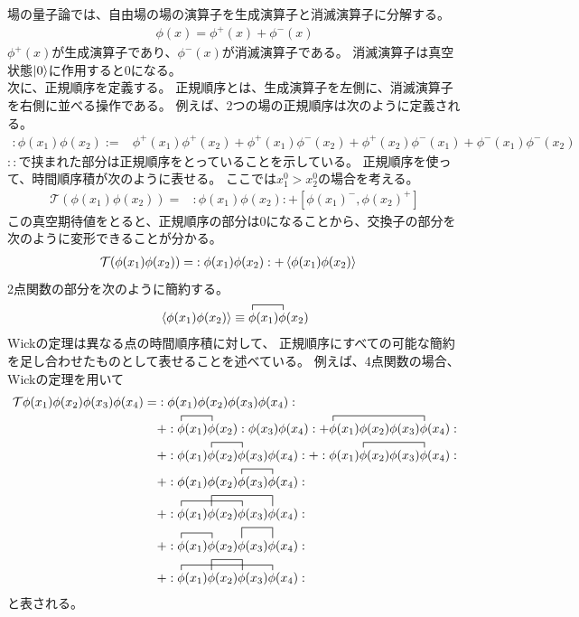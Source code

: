 \documentclass[11pt, dvipdfmx]{article}
\numberwithin{equation}{section}
\begin{document}
場の量子論では、自由場の場の演算子を生成演算子と消滅演算子に分解する。
\begin{align}
    \phi(x)=\phi^{+}(x)+\phi^{-}(x)
\end{align}
$\phi^{+}(x)$が生成演算子であり、$\phi^{-}(x)$が消滅演算子である。
消滅演算子は真空状態$\ket{0}$に作用すると0になる。
\\次に、正規順序を定義する。
正規順序とは、生成演算子を左側に、消滅演算子を右側に並べる操作である。
例えば、2つの場の正規順序は次のように定義される。
\begin{align}
    :\phi(x_1)\phi(x_2):=&\phi^{+}(x_1)\phi^{+}(x_2)+\phi^{+}(x_1)\phi^{-}(x_2)+\phi^{+}(x_2)\phi^{-}(x_1)+\phi^{-}(x_1)\phi^{-}(x_2)
\end{align}
$::$で挟まれた部分は正規順序をとっていることを示している。
正規順序を使って、時間順序積が次のように表せる。
ここでは$x^0_1>x^0_2$の場合を考える。
\begin{align}
    \mathcal{T}(\phi(x_1)\phi(x_2))=&:\phi(x_1)\phi(x_2):+[\phi(x_1)^- ,\phi(x_2)^+]
\end{align}
この真空期待値をとると、正規順序の部分は0になることから、交換子の部分を次のように変形できることが分かる。
\begin{align}
   \mathcal{T}(\phi(x_1)\phi(x_2))=&:\phi(x_1)\phi(x_2):+\ev{\phi(x_1)\phi(x_2)}
\end{align}
2点関数の部分を次のように簡約する。
\begin{align}
    \ev{\phi(x_1)\phi(x_2)}\equiv \contraction{}{\phi}{(x_1)}{\phi}\phi(x_1)\phi(x_2)
\end{align}
Wickの定理は異なる点の時間順序積に対して、
正規順序にすべての可能な簡約を足し合わせたものとして表せることを述べている。
例えば、4点関数の場合、Wickの定理を用いて
\begin{align}
    \mathcal{T}\phi(x_1)\phi(x_2)\phi(x_3)\phi(x_4)=&:\phi(x_1)\phi(x_2)\phi(x_3)\phi(x_4):\notag\\
    &+:\contraction{}{\phi}{(x_1)}{\phi}\phi(x_1)\phi(x_2):\phi(x_3)\phi(x_4):+\contraction{}{\phi}{(x_1)\phi(x_2)\phi(x_3)}{\phi}\phi(x_1)\phi(x_2)\phi(x_3)\phi(x_4):\notag\\
    &+:\contraction{\phi(x_1)}{\phi}{(x_2)}{\phi}\phi(x_1)\phi(x_2)\phi(x_3)\phi(x_4):+:\contraction{\phi(x_1)}{\phi}{(x_2)\phi(x_3)}{\phi}\phi(x_1)\phi(x_2)\phi(x_3)\phi(x_4):\notag\\
    &+:\contraction{\phi(x_1)\phi(x_2)}{\phi}{(x_3)}{\phi}\phi(x_1)\phi(x_2)\phi(x_3)\phi(x_4):\notag\\
    & +:\contraction{}{\phi}{(x_1)\phi(x_2)}{\phi}\contraction[2ex]{\phi(x_1)}{\phi}{(x_2)\phi(x_3)}{\phi}\phi(x_1)\phi(x_2)\phi(x_3)\phi(x_4):\notag\\
    &+:\contraction{}{\phi}{(x_1)}{\phi}\contraction[2ex]{\phi(x_1)\phi(x_2)}{\phi}{(x_3)}{\phi}\phi(x_1)\phi(x_2)\phi(x_3)\phi(x_4):\notag\\
    &+:\contraction{}{\phi}{(x_1)\phi(x_2)\phi(x_3)}{\phi}\contraction[2ex]{\phi(x_1)}{\phi}{(x_2)}{\phi}\phi(x_1)\phi(x_2)\phi(x_3)\phi(x_4):
\end{align}
と表される。
\end{document}
